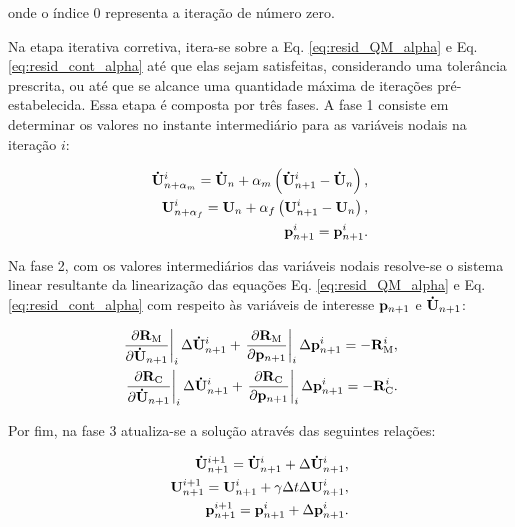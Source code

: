 \documentclass[tese_patricia]{subfiles}%
\begin{document}
\noindent onde o índice $0$ representa a iteração de número zero. 

Na etapa iterativa corretiva, itera-se sobre a Eq. \eqref{eq:resid_QM_alpha} e Eq. \eqref{eq:resid_cont_alpha} até que elas sejam satisfeitas, considerando uma tolerância prescrita, ou até que se alcance uma quantidade máxima de iterações pré-estabelecida. Essa etapa é composta por três fases. A fase 1 consiste em determinar os valores no instante intermediário para as variáveis nodais na iteração $i$:

\begin{align}
\mathbf{\dot{U}}_{n+\alpha_m}^{i} = \mathbf{\dot{U}}_n + \alpha_m \left( \mathbf{\dot{U}}_{n+1}^{i} - \mathbf{\dot{U}}_n \right), \label{eq:inter_acel_i}\\
\mathbf{U}_{n+\alpha_f}^{i} = \mathbf{U}_n + \alpha_f \left( \mathbf{U}_{n+1}^{i} - \mathbf{U}_n \right), \label{eq:inter_vel_i}\\
\mathbf{p}_{n+1}^{i} = \mathbf{p}_{n+1}^{i} \label{eq:inter_press_i}.
\end{align}

Na fase 2, com os valores intermediários das variáveis nodais resolve-se o sistema linear resultante da linearização das equações Eq. \eqref{eq:resid_QM_alpha} e Eq. \eqref{eq:resid_cont_alpha} com respeito às variáveis de interesse $\mathbf{p}_{n+1}$ e $\mathbf{\dot{U}}_{n+1}$:

\begin{align}
\left .\frac{\partial\mathbf{R}_\mathrm{M}}{\partial\mathbf{\dot{U}}_{n+1}}\right|_{i} \Delta \mathbf{\dot{U}}_{n+1}^{i} + \left .\frac{\partial\mathbf{R}_\mathrm{M}}{\partial\mathbf{p}_{n+1}}\right|_{i} \Delta \mathbf{p}_{n+1}^{i} = -\mathbf{R}_\mathrm{M}^{i}, \label{eq:eq_lin_QM} \\
\left .\frac{\partial\mathbf{R}_\mathrm{C}}{\partial\mathbf{\dot{U}}_{n+1}}\right|_{i} \Delta \mathbf{\dot{U}}_{n+1}^{i} + \left .\frac{\partial\mathbf{R}_\mathrm{C}}{\partial\mathbf{p}_{n+1}}\right|_{i} \Delta \mathbf{p}_{n+1}^{i} = -\mathbf{R}_\mathrm{C}^{i}.\label{eq:eq_lin_cont}
\end{align}

Por fim, na fase 3 atualiza-se a solução através das seguintes relações:

\begin{align}
\mathbf{\dot{U}}_{n+1}^{i+1} = \mathbf{\dot{U}}_{n+1}^{i} + \Delta\mathbf{\dot{U}}_{n+1}^{i},\label{atu_acel} \\ 
\mathbf{U}_{n+1}^{i+1} = \mathbf{U}_{n+1}^{i} + \gamma \Delta t \Delta\mathbf{U}_{n+1}^{i},\label{atu_vel}\\
\mathbf{p}_{n+1}^{i+1} = \mathbf{p}_{n+1}^{i} + \Delta\mathbf{p}_{n+1}^{i}.\label{atu_press}
\end{align}
\end{document}
